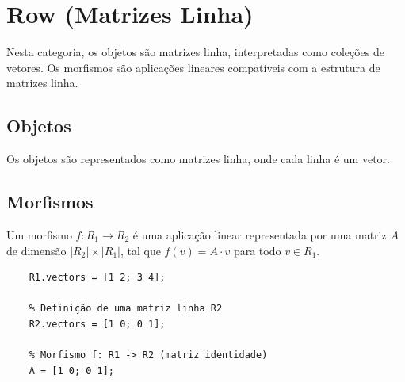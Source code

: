 \section{Row (Matrizes Linha)}
\label{sec:row}

Nesta categoria, os objetos são matrizes linha, interpretadas como coleções de vetores. Os morfismos são aplicações lineares compatíveis com a estrutura de matrizes linha.

\subsection{Objetos}
Os objetos são representados como matrizes linha, onde cada linha é um vetor.

\subsection{Morfismos}
Um morfismo $f: R_1 \to R_2$ é uma aplicação linear representada por uma matriz $A$ de dimensão $|R_2| \times |R_1|$, tal que $f(v) = A \cdot v$ para todo $v \in R_1$.

\begin{lstlisting}[style=matlab, caption={Exemplo de Matriz Linha e Morfismo}]
	% Definição de uma matriz linha R1
	R1.vectors = [1 2; 3 4];
	
	% Definição de uma matriz linha R2
	R2.vectors = [1 0; 0 1];
	
	% Morfismo f: R1 -> R2 (matriz identidade)
	A = [1 0; 0 1];
\end{lstlisting}